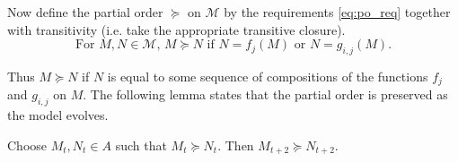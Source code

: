 \documentclass[reqno]{amsart}
\begin{document}
Now define the partial order $\succeq$ on $\mathcal{M}$ by the requirements \eqref{eq:po_req} together with transitivity (i.e. take the appropriate transitive closure).
\begin{equation} \label{eq:po_req}
   \text{For $M,N \in \mathcal{M}$, } M \succeq N \text{ if } N = f_j(M) \text{ or } N = g_{i,j}(M).
\end{equation}

Thus $M \succeq N$ if $N$ is equal to some sequence of compositions of the functions $f_j$ and $g_{i,j}$ on $M$. The following lemma states that the partial order is preserved as the model evolves.



\begin{lemma} \label{lem:partial_ordering}
    Choose $M_t, N_t \in A$ such that $M_t \succeq N_t$. Then $M_{t+2} \succeq N_{t+2}$.
\end{lemma}
\end{document}
